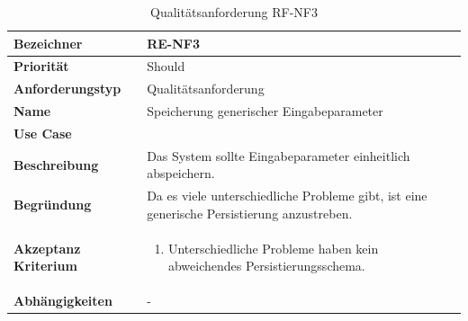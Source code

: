 \begin{table}[ht]
\centering
  \begin{tabular}{ l | p{8cm} }
	\hline
	\rowcolor{gray}
	\textbf{Bezeichner}&	\textbf{RE-NF3}\\ \hline
	\textbf{Priorität} 		&	Should\\ \hline
	\textbf{Anforderungstyp}	&	Qualitätsanforderung\\ \hline
	\textbf{Name} 			&	Speicherung generischer Eingabeparameter\\ \hline
	\textbf{Use Case} 		&	\nameref{table:use_case_1}\\ \hline
	\textbf{Beschreibung} 	&	Das System sollte Eingabeparameter einheitlich abspeichern.\\ \hline
	\textbf{Begründung} 		&	Da es viele unterschiedliche Probleme gibt, ist eine generische Persistierung anzustreben.\\ \hline
	\textbf{Akzeptanz Kriterium}	&	\begin{enumerate}
					\item Unterschiedliche Probleme haben kein abweichendes Persistierungsschema.
					\end{enumerate}
					\\ \hline
	\textbf{Abhängigkeiten} 	&	-\\ \hline
  \end{tabular}
   \caption{Qualitätsanforderung RF-NF3}\label{table:req_nf_3}
\end{table}

\newpage
